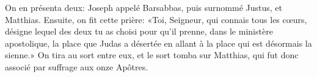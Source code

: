 On en présenta deux:
	Joseph appelé Barsabbas, puis surnommé Justus, et Matthias.
Ensuite, on fit cette prière: «Toi, Seigneur, qui connais tous les cœurs,
	désigne lequel des deux tu as choisi
		pour qu’il prenne, dans le ministère apostolique,
	la place que Judas a désertée
		en allant à la place qui est désormais la sienne.»
On tira au sort entre eux, et le sort tomba sur Matthias,
	qui fut donc associé par suffrage aux onze Apôtres.
